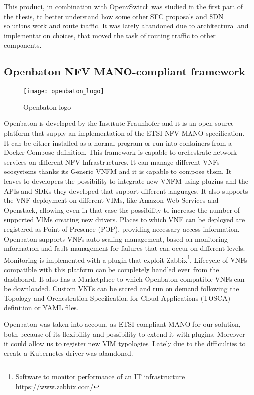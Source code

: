 This product, in combination with OpenvSwitch was studied in the first part of
the thesis, to better understand how some other SFC proposals and SDN solutions
work and route traffic. It was lately abandoned due to architectural and
implementation choices, that moved the task of routing traffic to other
components.

\subsection{Openbaton NFV MANO-compliant framework}
\begin{figure}[H]
  \centering \texttt{[image: openbaton\_logo]}
  \caption{Openbaton logo}
  \label{chap:prjan:img:openbaton_logo}
\end{figure}
Openbaton is developed by the Institute Fraunhofer and it is an open-source
platform that supply an implementation of the ETSI NFV MANO specification. It
can be either installed as a normal program or run into containers from a Docker
Compose definition. This framework is capable to orchestrate network services on
different NFV Infrastructures. It can manage different VNFs ecosystems thanks
its Generic VNFM and it is capable to compose them. It leaves to developers the
possibility to integrate new VNFM using plugins and the APIs and SDKs
they developed that support different languages. It also supports the VNF
deployment on different VIMs, like Amazon Web Services and Openstack, allowing
even in that case the possibility to increase the number of supported VIMs
creating new drivers. Places to which VNF can be deployed are registered as
Point of Presence (POP), providing necessary access information. Openbaton
supports VNFs auto-scaling management, based on monitoring information and fault
management for failures that can occur on different levels. Monitoring
is implemented with a plugin that exploit Zabbix\footnote{Software to monitor
performance of an IT infrastructure \url{https://www.zabbix.com/}}. Lifecycle of
VNFs compatible with this platform can be completely handled even from the
dashboard. It also has a Marketplace to which Openbaton-compatible VNFs can be
downloaded. Custom VNFs can be stored and run on demand following the Topology
and Orchestration Specification for Cloud Applications (TOSCA) definition or
YAML files.

Openbaton was taken into account as ETSI compliant MANO for our solution, both
because of its flexibility and possibility to extend it with plugins. Moreover
it could allow us to register new VIM typologies. Lately due to the difficulties
to create a Kubernetes driver was abandoned.

